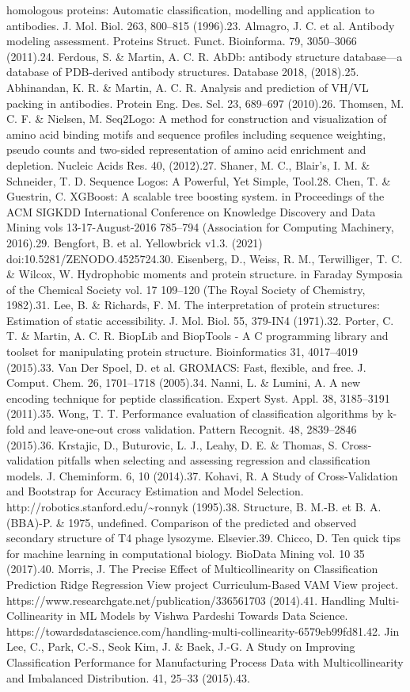 \documentclass[
]{article}
\begin{document}
{{{homologous proteins: Automatic classification, modelling and application to antibodies. J. Mol. Biol. 263, 800--815 (1996).23. Almagro, J. C. et al. Antibody modeling assessment. Proteins Struct. Funct. Bioinforma. 79, 3050--3066 (2011).24. Ferdous, S. \& Martin, A. C. R. AbDb: antibody structure database---a database of PDB-derived antibody structures. Database 2018, (2018).25. Abhinandan, K. R. \& Martin, A. C. R. Analysis and prediction of VH/VL packing in antibodies. Protein Eng. Des. Sel. 23, 689--697 (2010).26. Thomsen, M. C. F. \& Nielsen, M. Seq2Logo: A method for construction and visualization of amino acid binding motifs and sequence profiles including sequence weighting, pseudo counts and two-sided representation of amino acid enrichment and depletion. Nucleic Acids Res. 40, (2012).27. Shaner, M. C., Blair's, I. M. \& Schneider, T. D. Sequence Logos: A Powerful, Yet Simple, Tool.28. Chen, T. \& Guestrin, C. XGBoost: A scalable tree boosting system. in Proceedings of the ACM SIGKDD International Conference on Knowledge Discovery and Data Mining vols 13-17-August-2016 785--794 (Association for Computing Machinery, 2016).29. Bengfort, B. et al. Yellowbrick v1.3. (2021) doi:10.5281/ZENODO.4525724.30. Eisenberg, D., Weiss, R. M., Terwilliger, T. C. \& Wilcox, W. Hydrophobic moments and protein structure. in Faraday Symposia of the Chemical Society vol. 17 109--120 (The Royal Society of Chemistry, 1982).31. Lee, B. \& Richards, F. M. The interpretation of protein structures: Estimation of static accessibility. J. Mol. Biol. 55, 379-IN4 (1971).32. Porter, C. T. \& Martin, A. C. R. BiopLib and BiopTools - A C programming library and toolset for manipulating protein structure. Bioinformatics 31, 4017--4019 (2015).33. Van Der Spoel, D. et al. GROMACS: Fast, flexible, and free. J. Comput. Chem. 26, 1701--1718 (2005).34. Nanni, L. \& Lumini, A. A new encoding technique for peptide classification. Expert Syst. Appl. 38, 3185--3191 (2011).35. Wong, T. T. Performance evaluation of classification algorithms by k-fold and leave-one-out cross validation. Pattern Recognit. 48, 2839--2846 (2015).36. Krstajic, D., Buturovic, L. J., Leahy, D. E. \& Thomas, S. Cross-validation pitfalls when selecting and assessing regression and classification models. J. Cheminform. 6, 10 (2014).37. Kohavi, R. A Study of Cross-Validation and Bootstrap for Accuracy Estimation and Model Selection. http://robotics.stanford.edu/\textasciitilde ronnyk (1995).38. Structure, B. M.-B. et B. A. (BBA)-P. \& 1975, undefined. Comparison of the predicted and observed secondary structure of T4 phage lysozyme. Elsevier.39. Chicco, D. Ten quick tips for machine learning in computational biology. BioData Mining vol. 10 35 (2017).40. Morris, J. The Precise Effect of Multicollinearity on Classification Prediction Ridge Regression View project Curriculum-Based VAM View project. https://www.researchgate.net/publication/336561703 (2014).41. Handling Multi-Collinearity in ML Models \textbar{} by Vishwa Pardeshi \textbar{} Towards Data Science. https://towardsdatascience.com/handling-multi-collinearity-6579eb99fd81.42. Jin Lee, C., Park, C.-S., Seok Kim, J. \& Baek, J.-G. A Study on Improving Classification Performance for Manufacturing Process Data with Multicollinearity and Imbalanced Distribution. 41, 25--33 (2015).43. }}}
\end{document}
